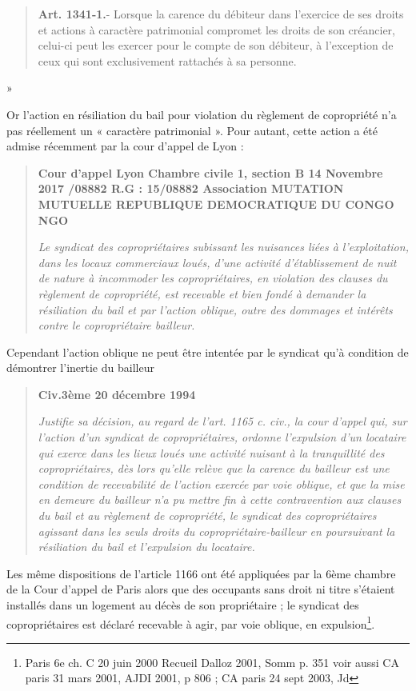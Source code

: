 			\begin{quote}
				\textbf{Art. 1341-1.}- Lorsque la carence du débiteur dans l’exercice de ses droits et actions à caractère patrimonial compromet les droits de son créancier, celui-ci peut les exercer pour le compte de son débiteur, à l’exception de ceux qui sont exclusivement rattachés à sa personne. 
			\end{quote}»
			
			Or l’action en résiliation du bail pour violation du règlement de copropriété n’a pas réellement un « caractère patrimonial ». Pour autant, cette action a été admise récemment par la cour d’appel de Lyon :
			
			\begin{quote}
				\textbf{Cour d'appel Lyon Chambre civile 1, section B 14 Novembre 2017 /08882 R.G : 15/08882 Association MUTATION MUTUELLE REPUBLIQUE DEMOCRATIQUE DU CONGO NGO}
				
				\textit{Le syndicat des copropriétaires subissant les nuisances liées à l’exploitation, dans les locaux commerciaux loués, d’une activité d'établissement de nuit de nature à incommoder les copropriétaires, en violation des clauses du règlement de copropriété, est recevable et bien fondé à demander la résiliation du bail et par l’action oblique, outre des dommages et intérêts contre le copropriétaire bailleur.}
			\end{quote}
			
			Cependant l’action oblique ne peut être intentée par le syndicat qu’à condition de démontrer l’inertie du bailleur
			\begin{quote}
				\textbf{Civ.3ème 20 décembre 1994}
				
				\textit{Justifie sa décision, au regard de l'art. 1165 c. civ., la cour d'appel qui, sur l'action d'un syndicat de copropriétaires, ordonne l'expulsion d'un locataire qui exerce dans les lieux loués une activité nuisant à la tranquillité des copropriétaires, dès lors qu'elle relève que la carence du bailleur est une condition de recevabilité de l'action exercée par voie oblique, et que la mise en demeure du bailleur n'a pu mettre fin à cette contravention aux clauses du bail et au règlement de copropriété, le syndicat des copropriétaires agissant dans les seuls droits du copropriétaire-bailleur en poursuivant la résiliation du bail et l'expulsion du locataire.}
			\end{quote}
		
			Les même dispositions de l’article 1166 ont été appliquées par la 6ème chambre de la Cour d’appel de Paris alors que des occupants sans droit ni titre s'étaient installés dans un logement au décès de son propriétaire ; le syndicat des copropriétaires est déclaré recevable à agir, par voie oblique, en expulsion\footnote{Paris 6e ch. C 20 juin 2000 Recueil Dalloz 2001, Somm p. 351 voir aussi CA paris 31 mars 2001, AJDI 2001, p 806 ; CA paris 24 sept 2003, Jd }.
	
